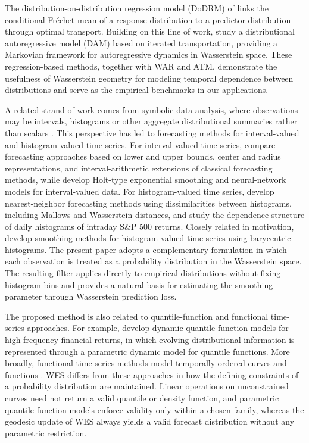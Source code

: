\documentclass[a4paper, 11pt]{article}
\theoremstyle{definition}
\begin{document}
The distribution-on-distribution regression model (DoDRM) of \citet{ghodrati2022distribution} links the conditional Fr\'echet mean of a response distribution to a predictor distribution through optimal transport. 
Building on this line of work, \citet{ghodrati2024distributional} study a distributional autoregressive model (DAM) based on iterated transportation, providing a Markovian framework for autoregressive dynamics in Wasserstein space. 
These regression-based methods, together with WAR and ATM, demonstrate the usefulness of Wasserstein geometry for modeling temporal dependence between distributions and serve as the empirical benchmarks in our applications.

A related strand of work comes from symbolic data analysis, where observations may be intervals, histograms or other aggregate distributional summaries rather than scalars \citep{BillardDiday2003,BillardDiday2006}. 
This perspective has led to forecasting methods for interval-valued and histogram-valued time series. 
For interval-valued time series, \citet{ArroyoEspinolaMate2011} compare forecasting approaches based on lower and upper bounds, center and radius representations, and interval-arithmetic extensions of classical forecasting methods, while \citet{MaiaCarvalho2011} develop Holt-type exponential smoothing and neural-network models for interval-valued data. 
For histogram-valued time series, \citet{ArroyoMate2009} develop nearest-neighbor forecasting methods using dissimilarities between histograms, including Mallows and Wasserstein distances, and \citet{GonzalezRiveraArroyo2012} study the dependence structure of daily histograms of intraday S\&P 500 returns. 
Closely related in motivation, \citet{ArroyoGonzalezRiveraMateMunoz2011} develop smoothing methods for histogram-valued time series using barycentric histograms. 
The present paper adopts a complementary formulation in which each observation is treated as a probability distribution in the Wasserstein space.
The resulting filter applies directly to empirical distributions without fixing histogram bins and provides a natural basis for estimating the smoothing parameter through Wasserstein prediction loss.

The proposed method is also related to quantile-function and functional time-series approaches. 
For example, \citet{Chen2022DQF} develop dynamic quantile-function models for high-frequency financial returns, in which evolving distributional information is represented through a parametric dynamic model for quantile functions. 
More broadly, functional time-series methods model temporally ordered curves and functions \citep{HyndmanUllah2007,HorvathKokoszka2012}.
WES differs from these approaches in how the defining constraints of a probability distribution are maintained.
Linear operations on unconstrained curves need not return a valid quantile or density function, and parametric quantile-function models enforce validity only within a chosen family, whereas the geodesic update of WES always yields a valid forecast distribution without any parametric restriction.
\end{document}

